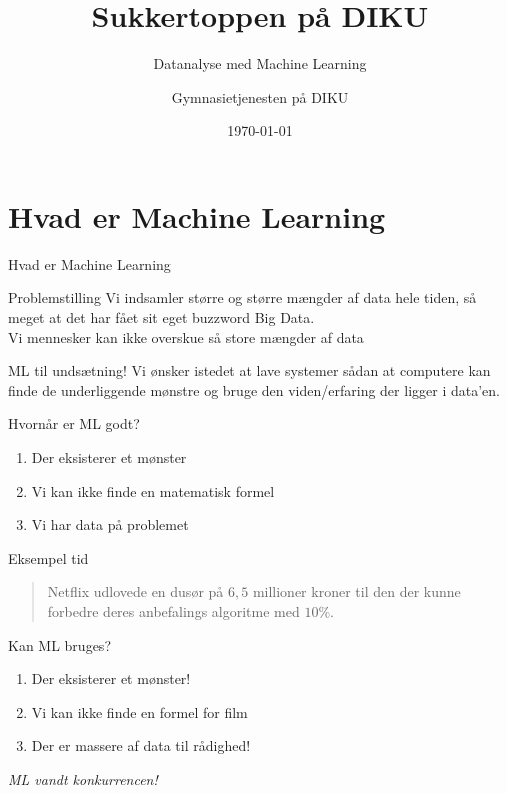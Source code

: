 \documentclass[12pt,t]{beamer}
\title{Sukkertoppen på DIKU}
\subtitle{Datanalyse med Machine Learning}
\author{
    Gymnasietjenesten på DIKU
}
\date[]{\today}
\begin{document}
\frame[plain]{\titlepage}
 \frame{\tableofcontents}

 \section{Hvad er Machine Learning}
     \begin{frame}[t]{Hvad er Machine Learning}
         \begin{block}{Problemstilling}
             Vi indsamler større og større mængder af data hele tiden, så meget
             at det har fået sit eget buzzword \alert{Big Data}. \\
             \pause
             Vi mennesker kan ikke overskue så store mængder af data
         \end{block}

         \pause

         \begin{block}{ML til undsætning!}
             Vi ønsker istedet at lave systemer sådan at computere kan finde de
             underliggende mønstre og bruge den viden/erfaring der ligger i
             data'en.
         \end{block}

         \pause

         \begin{block}{Hvornår er ML godt?}
             \begin{enumerate}
                 \item Der eksisterer et mønster \pause
                 \item Vi kan ikke finde en matematisk formel \pause
                 \item Vi har data på problemet
             \end{enumerate}
         \end{block}
     \end{frame}

     \begin{frame}[t]{Eksempel tid}
         \begin{quote}
             Netflix udlovede en dusør på $6,5$ millioner kroner til den der
             kunne forbedre deres anbefalings algoritme med $10\%$.
         \end{quote}

         \pause{}

         \begin{block}{Kan ML bruges?}
             \begin{enumerate}
                 \item Der eksisterer et mønster! \pause
                 \item Vi kan ikke finde en formel for film \pause
                 \item Der er massere af data til rådighed!
             \end{enumerate}
         \end{block}
         \pause{}
         \centering \emph{ML vandt konkurrencen!}
     \end{frame}
\end{document}
